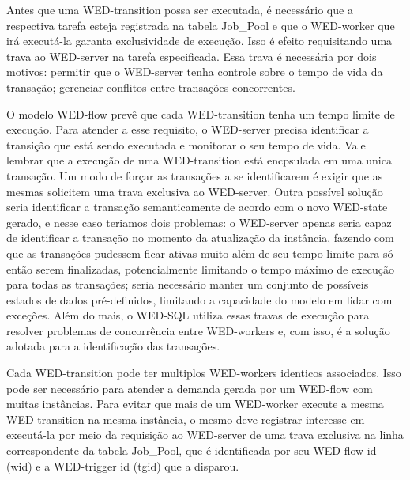 \documentclass[conference]{IEEEtran}
\begin{document}
Antes que uma WED-transition possa ser executada, é necessário que a respectiva tarefa esteja registrada na tabela Job\_Pool e que
o WED-worker que irá executá-la garanta exclusividade de execução. Isso é efeito requisitando uma trava ao WED-server na tarefa
especificada. Essa trava é necessária por dois motivos: permitir que o WED-server tenha controle sobre o tempo de vida da transação;
gerenciar conflitos entre transações concorrentes.

\par O modelo WED-flow prevê que cada WED-transition tenha um tempo limite de execução. Para atender a esse requisito, o WED-server
precisa identificar a transição que está sendo executada e monitorar o seu tempo de vida. Vale lembrar que a execução de uma
WED-transition está encpsulada em uma unica transação. Um modo de forçar as transações a se identificarem é exigir que as mesmas
solicitem uma trava exclusiva ao WED-server. Outra possível solução seria identificar a transação semanticamente de acordo
com o novo WED-state gerado, e nesse caso teriamos dois problemas: o WED-server apenas seria capaz de identificar a transação
no momento da atualização da instância, fazendo com que as transações pudessem ficar ativas muito além de seu tempo limite para
só então serem finalizadas, potencialmente limitando o tempo máximo de execução para todas as transações; seria necessário manter 
um conjunto de possíveis estados de dados pré-definidos, limitando a capacidade do modelo em lidar com exceções. Além do mais,
o WED-SQL utiliza essas travas de execução para resolver problemas de concorrência entre WED-workers e, com isso,
é a solução adotada para a identificação das transações. 


\par Cada WED-transition pode ter multiplos WED-workers identicos associados. Isso pode ser necessário para atender a demanda 
gerada por um WED-flow com muitas instâncias. Para evitar que mais de um WED-worker execute a mesma WED-transition na mesma
instância, o mesmo deve registrar interesse em executá-la por meio da requisição ao WED-server de uma trava exclusiva na linha
correspondente da tabela Job\_Pool, que é identificada por seu WED-flow id (wid) e a WED-trigger id (tgid) que a disparou.
\end{document}
